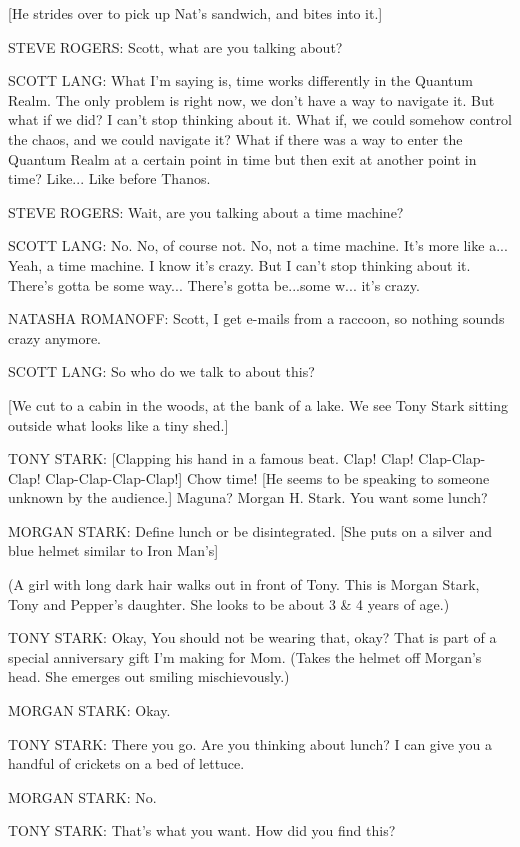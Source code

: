 [He strides over to pick up Nat's sandwich, and bites into it.]

STEVE ROGERS: Scott, what are you talking about?

SCOTT LANG: What I'm saying is, time works differently in the Quantum Realm. The only problem is right now, we don't have a way to navigate it. But what if we did? I can't stop thinking about it. What if, we could somehow control the chaos, and we could navigate it? What if there was a way to enter the Quantum Realm at a certain point in time but then exit at another point in time? Like... Like before Thanos.

STEVE ROGERS: Wait, are you talking about a time machine?

SCOTT LANG: No. No, of course not. No, not a time machine. It's more like a... Yeah, a time machine. I know it's crazy. But I can't stop thinking about it. There's gotta be some way... There's gotta be...some w... it's crazy.

NATASHA ROMANOFF: Scott, I get e-mails from a raccoon, so nothing sounds crazy anymore.

SCOTT LANG: So who do we talk to about this?

[We cut to a cabin in the woods, at the bank of a lake. We see Tony Stark sitting outside what looks like a tiny shed.]

TONY STARK: [Clapping his hand in a famous beat. Clap! Clap! Clap-Clap-Clap! Clap-Clap-Clap-Clap!] Chow time! [He seems to be speaking to someone unknown by the audience.] Maguna? Morgan H. Stark. You want some lunch?

MORGAN STARK: Define lunch or be disintegrated. [She puts on a silver and blue helmet similar to Iron Man's]

(A girl with long dark hair walks out in front of Tony. This is Morgan Stark, Tony and Pepper's daughter. She looks to be about 3 & 4 years of age.)

TONY STARK: Okay, You should not be wearing that, okay? That is part of a special anniversary gift I'm making for Mom. (Takes the helmet off Morgan's head. She emerges out smiling mischievously.)

MORGAN STARK: Okay.

TONY STARK: There you go. Are you thinking about lunch? I can give you a handful of crickets on a bed of lettuce.

MORGAN STARK: No.

TONY STARK: That's what you want. How did you find this?

